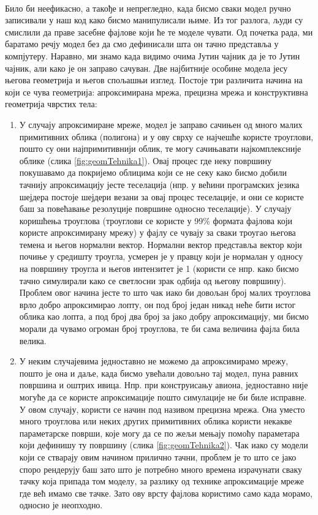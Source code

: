 \documentclass[12pt]{article}
\begin{document}
	\paragraph{}
	Било би неефикасно, а такође и непрегледно, када бисмо сваки модел ручно записивали у наш код како бисмо манипулисали њиме. Из тог разлога, људи су смислили да праве засебне фајлове који ће те моделе чувати. Од почетка рада, ми баратамо речју модел без да смо дефинисали шта он тачно представља у компјутеру. Наравно, ми знамо када видимо очима Јутин чајник да је то Јутин чајник, али како је он заправо сачуван. Две најбитније особине модела јесу његова геометрија и његов спољашњи изглед.
	Постоје три различита начина на који се чува геометрија: апроксимирана мрежа, прецизна мрежа и конструктивна геометрија чврстих тела:
	\begin{enumerate}
	\item У случају апроксимиране мреже, модел је заправо сачињен од много малих примитивних облика (полигона) и у ову сврху се најчешће користе троуглови, пошто су они најпримитивнији облик, те могу сачињавати најкомплексније облике (слика \ref{fig:geomTehnika1}). Овај процес где неку површину покушавамо да покријемо облицима који се не секу како бисмо добили тачнију апроксимацију јесте теселација (нпр. у већини програмских језика шејдера постоје шејдери везани за овај процес теселације, и они се користе баш за повећавање резолуције површине односно теселације). У случају коришћења троуглова (троуглови се користе у 99\% формата фајлова који користе апроксимирану мрежу) у фајлу се чувају за сваки троугао његова темена и његов нормални вектор. Нормални вектор представља вектор који почиње у средишту троугла, усмерен је у правцу који је нормалан у односу на површину троугла и његов интензитет је 1 (користи се нпр. како бисмо тачно симулирали како се светлосни зрак одбија од његову површину). Проблем овог начина јесте то што чак иако би довољан број малих троуглова врло добро апроксимирао лопту, он под број један никад неће бити истог облика као лопта, а под број два број за јако добру апроксимацију, ми бисмо морали да чувамо огроман број троуглова, те би сама величина фајла била велика.
	\item У неким случајевима једноставно не можемо да апроксимирамо мрежу, пошто је она и даље, када бисмо увећали довољно тај модел, пуна равних површина и оштрих ивица. Нпр. при конструисању авиона, једноставно није могуће да се користе апроксимације пошто симулације не би биле исправне. У овом случају, користи се начин под називом прецизна мрежа. Она уместо много троуглова или неких других примитивних облика користи некакве параметарске површи, које могу да се по жељи мењају помоћу параметара који дефинишу ту површину (слика \ref{fig:geomTehnika2}). Чак иако су модели који се стварају овим начином прилично тачни, проблем је то што се јако споро рендерују баш зато што је потребно много времена израчунати сваку тачку која припада том моделу, за разлику од технике апроксимације мреже где већ имамо све тачке. Зато ову врсту фајлова користимо само када морамо, односно је неопходно.

\end{enumerate}
\end{document}
